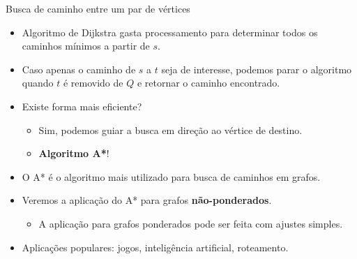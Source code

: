 \begin{frame}{Busca de caminho entre um par de vértices}

\begin{itemize}
	\item Algoritmo de Dijkstra gasta processamento para determinar todos os caminhos mínimos a partir de $s$.
	\item Caso apenas o caminho de $s$ a $t$ seja de interesse, podemos parar o algoritmo quando $t$ é removido de $Q$ e retornar o caminho encontrado.
	
	\item Existe forma mais eficiente?
	\begin{itemize}
		\item Sim, podemos guiar a busca em direção ao vértice de destino.
		\item \textbf{Algoritmo A*}!
	\end{itemize}

	\item O A* é o algoritmo mais utilizado para busca de caminhos em grafos.
	\item Veremos a aplicação do A* para grafos \textbf{não-ponderados}.
	\begin{itemize}
		\item A aplicação para grafos ponderados pode ser feita com ajustes simples.
	\end{itemize}
	\item Aplicações populares: jogos, inteligência artificial, roteamento. 
\end{itemize}
\end{frame}



